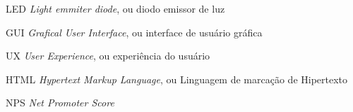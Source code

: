 
\begin{siglas}
    \item[LED] \textit{Light emmiter diode}, ou diodo emissor de luz
    \item[GUI] \textit{Grafical User Interface}, ou interface de usuário gráfica
    \item[UX] \textit{User Experience}, ou experiência do usuário
    \item[HTML] \textit{Hypertext Markup Language}, ou Linguagem de marcação de Hipertexto
    \item[NPS] \textit{Net Promoter Score} 
\end{siglas}


